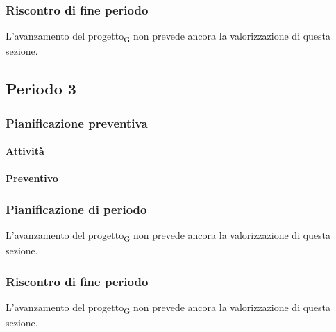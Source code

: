 \subsubsection{Riscontro di fine periodo}

L'avanzamento del progetto\textsubscript{G} non prevede ancora la valorizzazione di questa sezione.






\subsection{Periodo 3}

\subsubsection{Pianificazione preventiva}

\paragraph{Attività}

\planningTable{
	
}

\paragraph{Preventivo}

\smallPreventivoTable{
	
}

\subsubsection{Pianificazione di periodo}


L'avanzamento del progetto\textsubscript{G} non prevede ancora la valorizzazione di questa sezione.



\subsubsection{Riscontro di fine periodo}


L'avanzamento del progetto\textsubscript{G} non prevede ancora la valorizzazione di questa sezione.
